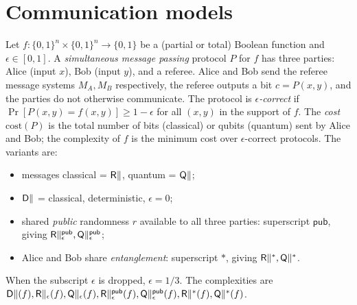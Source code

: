 \chapter{Communication models}

\begin{definition}
  \label{def:smp}
  Let $f : \{0,1\}^n \times \{0,1\}^n \to \{0,1\}$ be a (partial or total)
  Boolean function and $\epsilon \in [0,1]$. A \emph{simultaneous message
  passing} protocol $P$ for $f$ has three parties: Alice (input $x$), Bob (input
  $y$), and a referee. Alice and Bob send the referee message systems $M_A, M_B$
  respectively, the referee outputs a bit $c = P(x,y)$, and the parties do not
  otherwise communicate. The protocol is \emph{$\epsilon$-correct} if
  $\Pr[P(x,y)=f(x,y)] \ge 1-\epsilon$ for all $(x,y)$ in the support of $f$. The
  \emph{cost} $\mathrm{cost}(P)$ is the total number of bits (classical) or qubits
  (quantum) sent by Alice and Bob; the complexity of $f$ is the minimum cost over
  $\epsilon$-correct protocols. The variants are:
  \begin{itemize}
    \item messages classical = $\mathsf{R}\|$, quantum = $\mathsf{Q}\|$;
    \item $\mathsf{D}\|$ = classical, deterministic, $\epsilon = 0$;
    \item shared \emph{public} randomness $r$ available to all three parties:
      superscript $\mathsf{pub}$, giving $\mathsf{R}\|^{\mathsf{pub}}_\epsilon, \mathsf{Q}\|^{\mathsf{pub}}_\epsilon$;
    \item Alice and Bob share \emph{entanglement}: superscript $*$, giving
      $\mathsf{R}\|^{*}, \mathsf{Q}\|^{*}$.
  \end{itemize}
  When the subscript $\epsilon$ is dropped, $\epsilon = 1/3$. The complexities are
  $\mathsf{D}\|(f), \mathsf{R}\|_\epsilon(f), \mathsf{Q}\|_\epsilon(f), \mathsf{R}\|^{\mathsf{pub}}_\epsilon(f),
  \mathsf{Q}\|^{\mathsf{pub}}_\epsilon(f), \mathsf{R}\|^{*}(f), \mathsf{Q}\|^{*}(f)$.
\end{definition}

